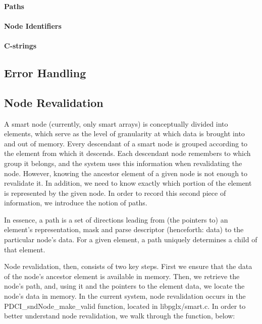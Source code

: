\documentclass{article}
\begin{document}
\paragraph{Paths}


\paragraph{Node Identifiers}


\paragraph{C-strings}


\subsection{Error Handling}
\label{sec:error-handling}

\subsection{Node Revalidation}

  A smart node (currently, only smart arrays) is conceptually divided 
into elements, which serve as the level of granularity at which data is 
brought into and out of memory. Every descendant of a smart node is 
grouped according to the element from which it descends. Each descendant 
node remembers to which group it belongs, and the system uses this 
information when revalidating the node. However, knowing the ancestor 
element of a given node is not enough to revalidate it. In addition, we 
need to know exactly which portion of the element is represented by the 
given node. In order to record this second piece of information, we 
introduce the notion of paths.

 In essence, a path is a set of directions leading from (the pointers 
to) an element's representation, mask and parse descriptor (henceforth: 
data) to the particular node's data. For a given element, a path 
uniquely determines a child of that element.

  Node revalidation, then, consists of two key steps. First we ensure 
that the data of the node's ancestor element is available in memory. 
Then, we retrieve the node's path, and, using it and the pointers to the 
element data, we locate the node's data in memory. In the current 
system, node revalidation occurs in the PDCI_sndNode_make_valid 
function, located in libpglx/smart.c. In order to better understand node 
revalidation, we walk through the function, below:
\end{document}
